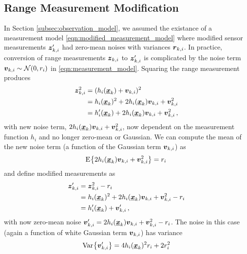 \documentclass[10pt,letterpaper,oneside,twocolumn,journal]{IEEEtran}
\theoremstyle{definition}
\theoremstyle{definition}
\theoremstyle{remark}
\begin{document}
\subsection{Range Measurement Modification} \label{subsec:range_measurement_mod}
In Section \ref{subsec:observation_model}, we assumed the existance of a measurement model \eqref{eqn:modified_measurement_model} where modified sensor measurements ${\boldsymbol{z}}'_{k,i}$ had zero-mean noises with variances ${\boldsymbol{r}}_{k,i}$. In practice, conversion of range measurements ${\boldsymbol{z}}_{k,i}$ to ${\boldsymbol{z}}'_{k,i}$ is complicated by the noise term ${\boldsymbol{v}}_{k,i} \sim \mathcal{N}(0, r_i)$ in \eqref{eqn:measurement_model}. Squaring the range measurement produces
\begin{equation}
    \begin{split}
        {\boldsymbol{z}}_{k,i}^2 &= (h_i({\boldsymbol{\underline{x}}}_k) + {\boldsymbol{v}}_{k,i})^2 \\
        &= h_i({\boldsymbol{\underline{x}}}_k)^2 + 2h_i({\boldsymbol{\underline{x}}}_k){\boldsymbol{v}}_{k,i} + {\boldsymbol{v}}_{k,i}^2 \\
        &= h'_i({\boldsymbol{\underline{x}}}_k) + 2h_i({\boldsymbol{\underline{x}}}_k){\boldsymbol{v}}_{k,i} + {\boldsymbol{v}}_{k,i}^2\,,
    \end{split}
\end{equation}
with new noise term, $2h_i({\boldsymbol{\underline{x}}}_k){\boldsymbol{v}}_{k,i} + {\boldsymbol{v}}_{k,i}^2$, now dependent on the measurement function $h_i$ and no longer zero-mean or Gaussian. We can compute the mean of the new noise term (a function of the Gaussian term ${\boldsymbol{v}}_{k,i}$) as
\begin{equation}
    \E{2h_i(\rvec{x}_k)\rv{v}_{k,i} + \rv{v}_{k,i}^2} = r_i\, \label{eqn:modified_noise_mean}
\end{equation}
and define modified measurements as
\begin{equation} \label{eqn:modified_measurement}
    \begin{split}
        \rv{z}'_{k,i} &= \rv{z}_{k,i}^2 - r_i \\
        &= h_i(\rvec{x}_k)^2 + 2h_i(\rvec{x}_k)\rv{v}_{k,i} + \rv{v}_{k,i}^2 - r_i \\
        &= h'_i(\rvec{x}_k) + \rv{v}'_{k,i}\,,
    \end{split}
\end{equation}
with now zero-mean noise ${\boldsymbol{v}}'_{k,i} = 2h_i({\boldsymbol{\underline{x}}}_k){\boldsymbol{v}}_{k,i} + {\boldsymbol{v}}_{k,i}^2 - r_i$. The noise in this case (again a function of white Gaussian term ${\boldsymbol{v}}_{k,i}$) has variance 
\begin{equation}
    \Var{\rv{v}'_{k,i}} = 4h_i(\rvec{x}_k)^2r_i + 2r_i^2
\end{equation}
\end{document}
